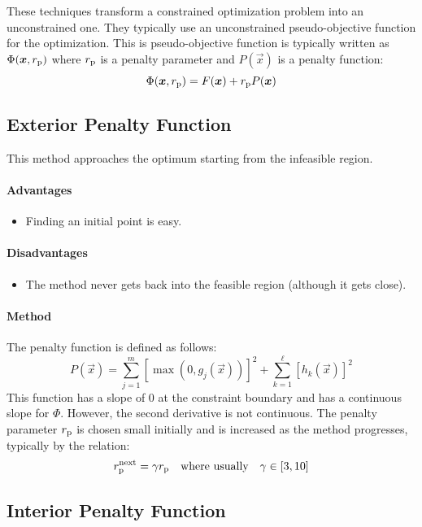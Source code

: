 \documentclass{article}
\begin{document}
These techniques transform a constrained optimization problem into an unconstrained one. They
typically use an unconstrained pseudo-objective function for the optimization. This is pseudo-objective function is typically written as \(\Phi(\bm{x}, r_{\mathrm{p}})\) where \(r_{\mathrm{p}}\) is a penalty parameter and \(P(\vec{x})\) is a penalty function:
\[\Phi(\bm{x}, r_{\mathrm{p}}) = F(\bm{x}) + r_{\mathrm{p}} P(\bm{x})\]

\subsection{Exterior Penalty Function}

This method approaches the optimum starting from the infeasible region.

\paragraph{Advantages}
\begin{itemize}
\item Finding an initial point is easy.
\end{itemize}

\paragraph{Disadvantages}
\begin{itemize}
\item The method never gets back into the feasible region (although it gets close).
\end{itemize}

\paragraph{Method}
The penalty function is defined as follows:
\[P(\vec{x})
= \sum_{j=1}^m{\left[\max\left(0, g_j(\vec{x})\right)\right]}^2
+ \sum_{k=1}^\ell{\left[h_k(\vec{x})\right]}^2\]
This function has a slope of 0 at the constraint boundary and has a continuous slope for
\(\Phi\). However, the second derivative is not continuous. The penalty parameter \(r_{\mathrm{p}}\) is
chosen small initially and is increased as the method progresses, typically by the relation:
\[r_{\mathrm{p}}^\textrm{next} = \gamma r_{\mathrm{p}} \quad \textrm{where usually} \quad \gamma \in [3, 10]\]

\subsection{Interior Penalty Function}
\end{document}
